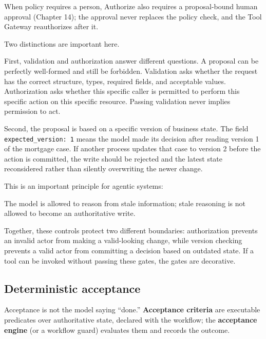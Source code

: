 When policy requires a person, Authorize also requires a proposal-bound human approval (Chapter 14); the approval never replaces the policy check, and the Tool Gateway reauthorizes after it.\par

Two distinctions are important here.\par

First, validation and authorization answer different questions. A proposal can be perfectly well-formed and still be forbidden. Validation asks whether the request has the correct structure, types, required fields, and acceptable values. Authorization asks whether this specific caller is permitted to perform this specific action on this specific resource. Passing validation never implies permission to act.\par

Second, the proposal is based on a specific version of business state. The field \lstinline[style=bookinline]!expected_version: 1! means the model made its decision after reading version 1 of the mortgage case. If another process updates that case to version 2 before the action is committed, the write should be rejected and the latest state reconsidered rather than silently overwriting the newer change.\par

This is an important principle for agentic systems:\par

\begin{bookquote}

The model is allowed to reason from stale information; stale reasoning is not allowed to become an authoritative write.

\end{bookquote}

Together, these controls protect two different boundaries: authorization prevents an invalid actor from making a valid-looking change, while version checking prevents a valid actor from committing a decision based on outdated state. If a tool can be invoked without passing these gates, the gates are decorative.\par

\subsection{Deterministic acceptance}

Acceptance is not the model saying “done.” \textbf{Acceptance criteria} are executable predicates over authoritative state, declared with the workflow; the \textbf{acceptance engine} (or a workflow guard) evaluates them and records the outcome.\par

